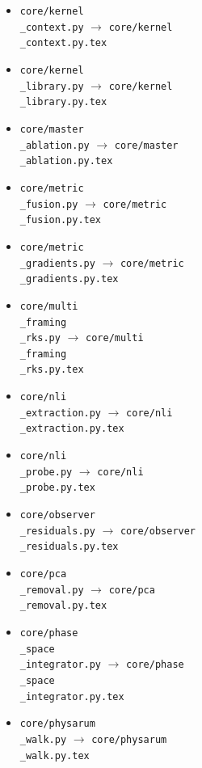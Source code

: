 \documentclass[11pt]{article}
\begin{document}
\begin{itemize}
\item \texttt{core/kernel\\_context.py} $\rightarrow$ \texttt{core/kernel\\_context.py.tex}
\item \texttt{core/kernel\\_library.py} $\rightarrow$ \texttt{core/kernel\\_library.py.tex}
\item \texttt{core/master\\_ablation.py} $\rightarrow$ \texttt{core/master\\_ablation.py.tex}
\item \texttt{core/metric\\_fusion.py} $\rightarrow$ \texttt{core/metric\\_fusion.py.tex}
\item \texttt{core/metric\\_gradients.py} $\rightarrow$ \texttt{core/metric\\_gradients.py.tex}
\item \texttt{core/multi\\_framing\\_rks.py} $\rightarrow$ \texttt{core/multi\\_framing\\_rks.py.tex}
\item \texttt{core/nli\\_extraction.py} $\rightarrow$ \texttt{core/nli\\_extraction.py.tex}
\item \texttt{core/nli\\_probe.py} $\rightarrow$ \texttt{core/nli\\_probe.py.tex}
\item \texttt{core/observer\\_residuals.py} $\rightarrow$ \texttt{core/observer\\_residuals.py.tex}
\item \texttt{core/pca\\_removal.py} $\rightarrow$ \texttt{core/pca\\_removal.py.tex}
\item \texttt{core/phase\\_space\\_integrator.py} $\rightarrow$ \texttt{core/phase\\_space\\_integrator.py.tex}
\item \texttt{core/physarum\\_walk.py} $\rightarrow$ \texttt{core/physarum\\_walk.py.tex}

\end{itemize}
\end{document}
